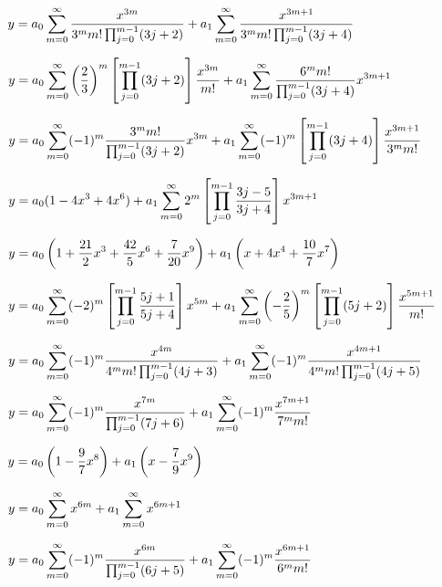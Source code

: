 $y=\displaystyle{a_{0}\sum_{m=0}^{\infty}
\frac{x^{3m}}{3^{m}m!\prod_{j=0}^{m-1}(3j+2)}+a_{1}\sum_{m=0}^{\infty}
\frac{x^{3m+1}}{3^{m}m!\prod_{j=0}^{m-1}(3j+4)}}$

$y=\displaystyle{a_{0}\sum_{m=0}^{\infty}
\left(\frac{2}{3}\right)^{m}\left[\prod_{j=0}^{m-1}(3j+2)\right]{\frac{x^{3m}}{m!}}
+a_{1}\sum_{m=0}^{\infty}\frac{6^{m}m!}{\prod_{j=0}^{m-1}(3j+4)}x^{3m+1}}$

$y=\displaystyle{a_{0}\sum_{m=0}^{\infty}
(-1)^{m}\frac{3^{m}m!}{\prod_{j=0}^{m-1}(3j+2)}x^{3m}
+a_{1}\sum_{m=0}^{\infty}
(-1)^{m}\left[\prod_{j=0}^{m-1}(3j+4)\right]{\frac{x^{3m+1}}{3^{m}m!}}}$

$y=\displaystyle{a_{0}(1-4x^{3}+4x^{6})+a_{1}\sum_{m=0}^{\infty}
2^{m}\left[\prod_{j=0}^{m-1}\frac{3j-5}{3j+4}\right]x^{3m+1}}$

$y=\displaystyle{a_{0}\left(1+\frac{21}{2}x^{3}+\frac{42}{5}x^{6}+\frac{7}{20}x^{9}\right)
+a_{1}\left(x+4x^{4}+\frac{10}{7}x^{7}\right)}$

$y=\displaystyle{a_{0}\sum_{m=0}^{\infty}
(-2)^{m}\left[\prod_{j=0}^{m-1}\frac{5j+1}{5j+4}\right]x^{5m}+
a_{1}\sum_{m=0}^{\infty}
\left(-\frac{2}{5}\right)^{m}\left[\prod_{j=0}^{m-1}(5j+2)\right]{\frac{x^{5m+1}}{m!}}}$

$y=\displaystyle{a_{0}\sum_{m=0}^{\infty}
(-1)^{m}\frac{x^{4m}}{4^{m}m!\prod_{j=0}^{m-1}(4j+3)}+a_{1}\sum_{m=0}^{\infty}
(-1)^{m}\frac{x^{4m+1}}{4^{m}m!\prod_{j=0}^{m-1}(4j+5)}}$

$y=\displaystyle{a_{0}\sum_{m=0}^{\infty}(-1)^{m}\frac{x^{7m}}{\prod_{j=0}^{m-1}(7j+6)}+
a_{1}\sum_{m=0}^{\infty}(-1)^{m}\frac{x^{7m+1}}{7^{m}m!}}$

$y=\displaystyle{a_{0}\left(1-\frac{9}{7}x^{8}\right)+a_{1}\left(x-\frac{7}{9}x^{9}\right)}$

$y=\displaystyle{a_{0}\sum_{m=0}^{\infty}x^{6m}+a_{1}\sum_{m=0}^{\infty}x^{6m+1}}$

$y=\displaystyle{a_{0}\sum_{m=0}^{\infty}(-1)^{m}\frac{x^{6m}}{\prod_{j=0}^{m-1}(6j+5)}+
a_{1}\sum_{m=0}^{\infty}(-1)^{m}\frac{x^{6m+1}}{6^{m}m!}}$

